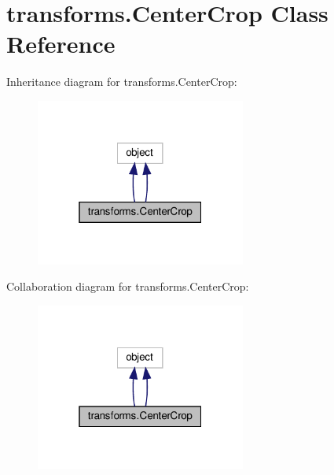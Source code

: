 \hypertarget{classtransforms_1_1CenterCrop}{}\section{transforms.\+Center\+Crop Class Reference}
\label{classtransforms_1_1CenterCrop}


Inheritance diagram for transforms.\+Center\+Crop\+:
\nopagebreak
\begin{figure}[H]
\begin{center}
\leavevmode
\includegraphics[width=196pt]{classtransforms_1_1CenterCrop__inherit__graph}
\end{center}
\end{figure}


Collaboration diagram for transforms.\+Center\+Crop\+:
\nopagebreak
\begin{figure}[H]
\begin{center}
\leavevmode
\includegraphics[width=196pt]{classtransforms_1_1CenterCrop__coll__graph}
\end{center}
\end{figure}
